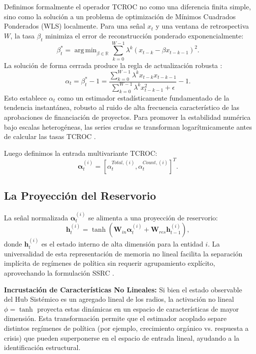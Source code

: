 \documentclass[11pt, letterpaper]{report}
\DeclareMathOperator*{\argmin}{arg\,min}
\newcommand{\mat}[1]{\mathbf{#1}}
\newcommand{\vect}[1]{\mathbf{#1}}
\begin{document}
Definimos formalmente el operador TCROC no como una diferencia finita simple, sino como la solución a un problema de optimización de Mínimos Cuadrados Ponderados (WLS) localmente. Para una señal $x_t$ y una ventana de retrospectiva $W$, la tasa $\beta_t$ minimiza el error de reconstrucción ponderado exponencialmente:
\begin{equation}
    \beta_t^* = \argmin_{\beta \in \mathbb{R}} \sum_{k=0}^{W-1} \lambda^k \left( x_{t-k} - \beta x_{t-k-1} \right)^2.
\end{equation}
La solución de forma cerrada produce la regla de actualización robusta \cite{Sabillon2025}:
\begin{equation}
    \alpha_t = \beta_t^* - 1 = \frac{\sum_{k=0}^{W-1} \lambda^k x_{t-k} x_{t-k-1}}{\sum_{k=0}^{W-1} \lambda^k x_{t-k-1}^2 + \epsilon} - 1.
\end{equation}
Esto establece $\alpha_t$ como un estimador estadísticamente fundamentado de la tendencia instantánea, robusto al ruido de alta frecuencia característico de las aprobaciones de financiación de proyectos. Para promover la estabilidad numérica bajo escalas heterogéneas, las series crudas se transforman logarítmicamente antes de calcular las tasas TCROC \cite{SabillonThesis2025}.

Luego definimos la entrada multivariante TCROC:
\begin{equation}
\boldsymbol{\alpha}_t^{(i)} = [\alpha_t^{Total,(i)}, \alpha_t^{Count,(i)}]^T.
\end{equation}

\subsection{La Proyección del Reservorio}

La señal normalizada $\boldsymbol{\alpha}_t^{(i)}$ se alimenta a una proyección de reservorio:
\begin{equation}
    \vect{h}_t^{(i)} =
    \tanh\!\left(
    \mat{W}_{in} \boldsymbol{\alpha}_t^{(i)}
    + \mat{W}_{res} \vect{h}_{t-1}^{(i)}
    \right),
\end{equation}
donde $\vect{h}_t^{(i)}$ es el estado interno de alta dimensión para la entidad $i$. La universalidad de esta representación de memoria no lineal facilita la separación implícita de regímenes de política sin requerir agrupamiento explícito, aprovechando la formulación SSRC \cite{banegas2025}.

\textbf{Incrustación de Características No Lineales:} Si bien el estado observable del Hub Sistémico es un agregado lineal de los radios, la activación no lineal $\phi = \tanh$ proyecta estas dinámicas en un espacio de características de mayor dimensión. Esta transformación permite que el estimador acoplado separe distintos regímenes de política (por ejemplo, crecimiento orgánico vs. respuesta a crisis) que pueden superponerse en el espacio de entrada lineal, ayudando a la identificación estructural.
\end{document}
